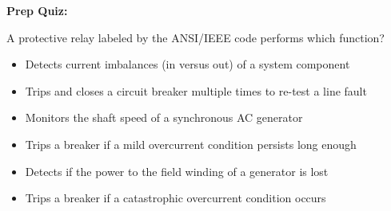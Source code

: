 \vfil \eject

\noindent
{\bf Prep Quiz:}

A protective relay labeled by the ANSI/IEEE code  performs which function?

\begin{itemize}
\item{} Detects current imbalances (in versus out) of a system component
\vskip 5pt 
\item{} Trips and closes a circuit breaker multiple times to re-test a line fault
\vskip 5pt 
\item{} Monitors the shaft speed of a synchronous AC generator
\vskip 5pt 
\item{} Trips a breaker if a mild overcurrent condition persists long enough
\vskip 5pt 
\item{} Detects if the power to the field winding of a generator is lost
\vskip 5pt 
\item{} Trips a breaker if a catastrophic overcurrent condition occurs
\end{itemize}





